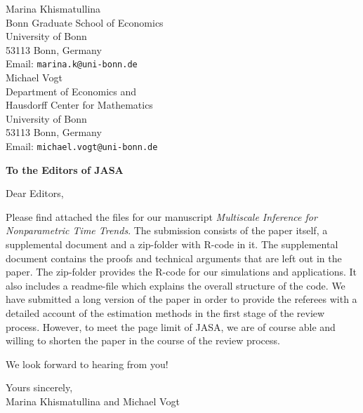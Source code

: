 \documentclass[12pt,a4paper]{letter}
\begin{document}
\pagestyle{empty}



Marina Khismatullina \\
Bonn Graduate School of Economics \\ 
University of Bonn \\
53113 Bonn, Germany \\ 
Email: \texttt{marina.k@uni-bonn.de} \\[1pt]

Michael Vogt \\
Department of Economics and \\
Hausdorff Center for Mathematics \\
University of Bonn \\
53113 Bonn, Germany \\
Email: \texttt{michael.vogt@uni-bonn.de} 

\vspace{35pt}


\textbf{To the Editors of JASA}
\vspace{20pt}


Dear Editors,
\vspace{7pt}

Please find attached the files for our manuscript \textit{Multiscale Inference for Nonparametric Time Trends}. The submission consists of the paper itself, a supplemental document and a zip-folder with R-code in it. The supplemental document contains the proofs and technical arguments that are left out in the paper. The zip-folder provides the R-code for our simulations and applications. It also includes a readme-file which explains the overall structure of the code. We have submitted a long version of the paper in order to provide the referees with a detailed account of the estimation methods in the first stage of the review process. However, to meet the page limit of JASA, we are of course able and willing to shorten the paper in the course of the review process.

We look forward to hearing from you!
\vspace{35pt}

Yours sincerely, \\
Marina Khismatullina and Michael Vogt 
\end{document}
